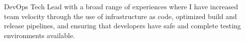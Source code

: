 

\begin{cvparagraph}

DevOps Tech Lead with a broad range of experiences where I have increased team velocity through the use of infrastructure as code, optimized build and release pipelines, and ensuring that developers have safe and complete testing environments available.
\end{cvparagraph}

